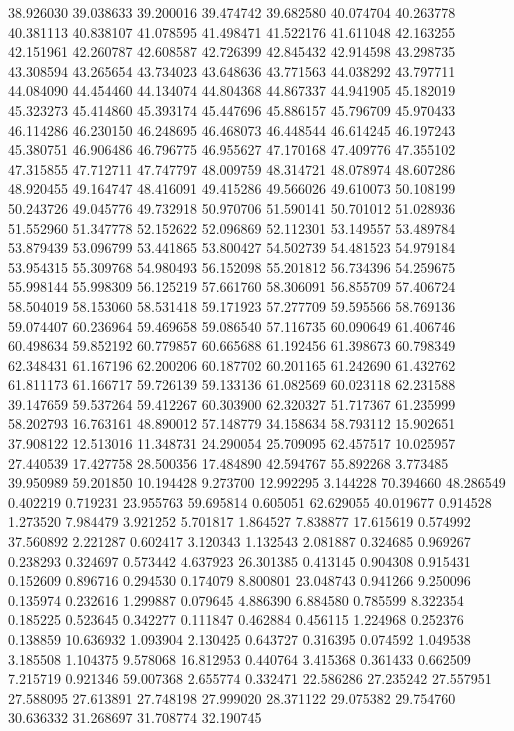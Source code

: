 38.926030
39.038633
39.200016
39.474742
39.682580
40.074704
40.263778
40.381113
40.838107
41.078595
41.498471
41.522176
41.611048
42.163255
42.151961
42.260787
42.608587
42.726399
42.845432
42.914598
43.298735
43.308594
43.265654
43.734023
43.648636
43.771563
44.038292
43.797711
44.084090
44.454460
44.134074
44.804368
44.867337
44.941905
45.182019
45.323273
45.414860
45.393174
45.447696
45.886157
45.796709
45.970433
46.114286
46.230150
46.248695
46.468073
46.448544
46.614245
46.197243
45.380751
46.906486
46.796775
46.955627
47.170168
47.409776
47.355102
47.315855
47.712711
47.747797
48.009759
48.314721
48.078974
48.607286
48.920455
49.164747
48.416091
49.415286
49.566026
49.610073
50.108199
50.243726
49.045776
49.732918
50.970706
51.590141
50.701012
51.028936
51.552960
51.347778
52.152622
52.096869
52.112301
53.149557
53.489784
53.879439
53.096799
53.441865
53.800427
54.502739
54.481523
54.979184
53.954315
55.309768
54.980493
56.152098
55.201812
56.734396
54.259675
55.998144
55.998309
56.125219
57.661760
58.306091
56.855709
57.406724
58.504019
58.153060
58.531418
59.171923
57.277709
59.595566
58.769136
59.074407
60.236964
59.469658
59.086540
57.116735
60.090649
61.406746
60.498634
59.852192
60.779857
60.665688
61.192456
61.398673
60.798349
62.348431
61.167196
62.200206
60.187702
60.201165
61.242690
61.432762
61.811173
61.166717
59.726139
59.133136
61.082569
60.023118
62.231588
39.147659
59.537264
59.412267
60.303900
62.320327
51.717367
61.235999
58.202793
16.763161
48.890012
57.148779
34.158634
58.793112
15.902651
37.908122
12.513016
11.348731
24.290054
25.709095
62.457517
10.025957
27.440539
17.427758
28.500356
17.484890
42.594767
55.892268
3.773485
39.950989
59.201850
10.194428
9.273700
12.992295
3.144228
70.394660
48.286549
0.402219
0.719231
23.955763
59.695814
0.605051
62.629055
40.019677
0.914528
1.273520
7.984479
3.921252
5.701817
1.864527
7.838877
17.615619
0.574992
37.560892
2.221287
0.602417
3.120343
1.132543
2.081887
0.324685
0.969267
0.238293
0.324697
0.573442
4.637923
26.301385
0.413145
0.904308
0.915431
0.152609
0.896716
0.294530
0.174079
8.800801
23.048743
0.941266
9.250096
0.135974
0.232616
1.299887
0.079645
4.886390
6.884580
0.785599
8.322354
0.185225
0.523645
0.342277
0.111847
0.462884
0.456115
1.224968
0.252376
0.138859
10.636932
1.093904
2.130425
0.643727
0.316395
0.074592
1.049538
3.185508
1.104375
9.578068
16.812953
0.440764
3.415368
0.361433
0.662509
7.215719
0.921346
59.007368
2.655774
0.332471
22.586286
27.235242
27.557951
27.588095
27.613891
27.748198
27.999020
28.371122
29.075382
29.754760
30.636332
31.268697
31.708774
32.190745
